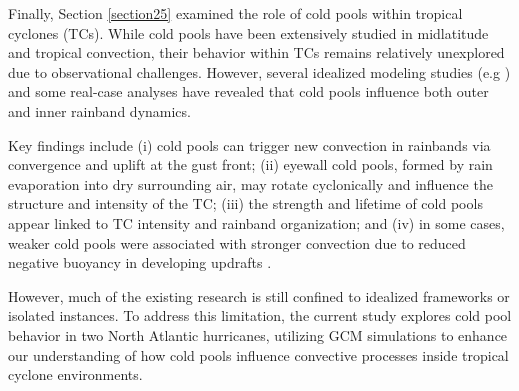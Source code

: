 Finally, Section \ref{section25} examined the role of cold pools within tropical cyclones (TCs). While cold pools have been extensively studied in midlatitude and tropical convection, their behavior within TCs remains relatively unexplored due to observational challenges. However, several idealized modeling studies (e.g  ) and some real-case analyses  have revealed that cold pools influence both outer and inner rainband dynamics.

Key findings include (i) cold pools can trigger new convection in rainbands via convergence and uplift at the gust front; (ii) eyewall cold pools, formed by rain evaporation into dry surrounding air, may rotate cyclonically and influence the structure and intensity of the TC; (iii) the strength and lifetime of cold pools appear linked to TC intensity and rainband organization; and (iv) in some cases, weaker cold pools were associated with stronger convection due to reduced negative buoyancy in developing updrafts \cite{grant2018coldpools}.

However, much of the existing research is still confined to idealized frameworks or isolated instances. To address this limitation, the current study explores cold pool behavior in two North Atlantic hurricanes, utilizing GCM simulations to enhance our understanding of how cold pools influence convective processes inside tropical cyclone environments.










